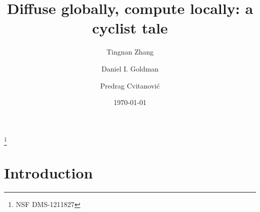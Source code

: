 \documentclass[aps,pre,
                showpacs,
                twocolumn,
                groupedaddress,
                floatfix]{revtex4-1}
\begin{document}
\title{Diffuse globally, compute locally: a cyclist tale}
\author{Tingnan Zhang}
\author{Daniel I. Goldman}
\author{Predrag Cvitanovi\'c}

\thanks{NSF DMS-1211827}



\date{\today}

\begin{abstract}
  
\end{abstract}



\maketitle


\section{Introduction}
\end{document}
